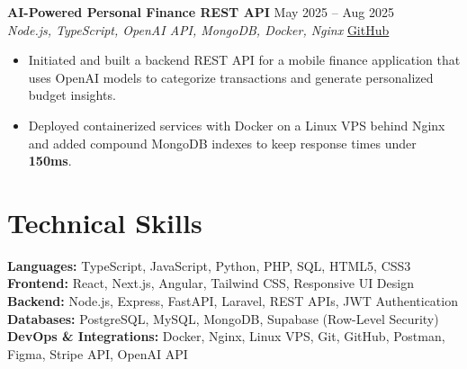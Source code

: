 \documentclass[10pt,a4paper]{article}
\newcommand{\entry}[4]{%
  {\bfseries #1} \hfill {\color{muted}#2}\\
  {\color{accent}\itshape #3} \hfill {\color{muted}\small #4}\par
  \vspace{1pt}}
\begin{document}
\entry{AI-Powered Personal Finance REST API}{May 2025 -- Aug 2025}%
{Node.js, TypeScript, OpenAI API, MongoDB, Docker, Nginx}%
{\href{https://github.com/junnot-daniel}{GitHub}}
\begin{itemize}
  \item Initiated and built a backend REST API for a mobile finance
        application that uses OpenAI models to categorize transactions and
        generate personalized budget insights.
  \item Deployed containerized services with Docker on a Linux VPS behind
        Nginx and added compound MongoDB indexes to keep response times
        under \textbf{150ms}.
\end{itemize}

\vfill

\section*{Technical Skills}
\textbf{Languages:} TypeScript, JavaScript, Python, PHP, SQL, HTML5, CSS3\\[2.5pt]
\textbf{Frontend:} React, Next.js, Angular, Tailwind CSS, Responsive UI Design\\[2.5pt]
\textbf{Backend:} Node.js, Express, FastAPI, Laravel, REST APIs, JWT Authentication\\[2.5pt]
\textbf{Databases:} PostgreSQL, MySQL, MongoDB, Supabase (Row-Level Security)\\[2.5pt]
\textbf{DevOps \& Integrations:} Docker, Nginx, Linux VPS, Git, GitHub, Postman, Figma, Stripe API, OpenAI API
\end{document}
